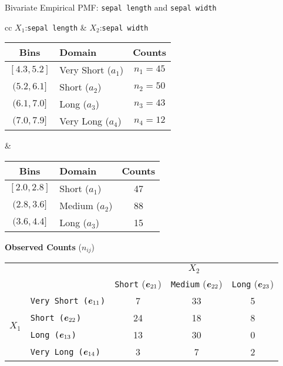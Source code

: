 \begin{frame}{Bivariate Empirical PMF: {\tt sepal length} and {\tt sepal width}}

\begin{center}
  \small
  \begin{tabular}{cc}
	$X_1$:{\tt sepal length} & $X_2$:{\tt sepal width}\\
\begin{tabular}{|c|l|c|}
        \hline
        Bins & Domain & Counts\\
        \hline
        $[4.3, 5.2]$ & Very Short ($a_1$) & $n_1 = 45$\\
        $(5.2, 6.1]$ & Short ($a_2$) & $n_2 = 50$\\
        $(6.1, 7.0]$ & Long ($a_3$)& $n_3 = 43$\\
        $(7.0, 7.9]$ & Very Long ($a_4$)& $n_4 = 12$\\
        \hline
    \end{tabular}%
  &
	\begin{tabular}{|c|l|c|}
        \hline
        Bins & Domain & Counts\\
        \hline
        $[2.0, 2.8]$ & Short ($a_1$) & 47\\
        $(2.8, 3.6]$ & Medium ($a_2$) & 88\\
        $(3.6, 4.4]$ & Long ($a_3$) & 15\\
        \hline
    \end{tabular}
  \end{tabular}
\end{center}


{\bf Observed Counts} ($\textit{n}_{\textit{ij}}$)

\centering
\begin{tabular}{|c|l||c|c|c|}
\hline
    & &\multicolumn{3}{c|}{$X_2$}\\
    \cline{3-5}
    & &{{\tt Short} (${\boldsymbol e}_{21}$)} & {{\tt Medium} (${\boldsymbol e}_{22}$)} &     {{\tt Long} (${\boldsymbol e}_{23}$)}\\
    \hline\hline
    \multirow{4}{*}{$X_1$}
    & {\tt Very Short (${\boldsymbol e}_{11}$)} &  7  & 33  & 5\\
    &{\tt Short (${\boldsymbol e}_{22}$)} & 24  &18  & 8\\
    &{\tt Long (${\boldsymbol e}_{13}$)} & 13  & 30   & 0\\
    &{\tt Very Long (${\boldsymbol e}_{14}$)} & 3  & 7   & 2\\
\hline
\end{tabular}%
\end{frame}


